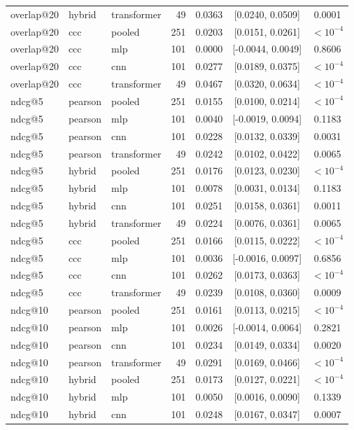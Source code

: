 \begin{longtable}{lllrrcc}
overlap@20 & hybrid & transformer & 49 & 0.0363 & [0.0240, 0.0509] & 0.0001 \\
overlap@20 & ccc & pooled & 251 & 0.0203 & [0.0151, 0.0261] & $<10^{-4}$ \\
overlap@20 & ccc & mlp & 101 & 0.0000 & [-0.0044, 0.0049] & 0.8606 \\
overlap@20 & ccc & cnn & 101 & 0.0277 & [0.0189, 0.0375] & $<10^{-4}$ \\
overlap@20 & ccc & transformer & 49 & 0.0467 & [0.0320, 0.0634] & $<10^{-4}$ \\
ndcg@5 & pearson & pooled & 251 & 0.0155 & [0.0100, 0.0214] & $<10^{-4}$ \\
ndcg@5 & pearson & mlp & 101 & 0.0040 & [-0.0019, 0.0094] & 0.1183 \\
ndcg@5 & pearson & cnn & 101 & 0.0228 & [0.0132, 0.0339] & 0.0031 \\
ndcg@5 & pearson & transformer & 49 & 0.0242 & [0.0102, 0.0422] & 0.0065 \\
ndcg@5 & hybrid & pooled & 251 & 0.0176 & [0.0123, 0.0230] & $<10^{-4}$ \\
ndcg@5 & hybrid & mlp & 101 & 0.0078 & [0.0031, 0.0134] & 0.1183 \\
ndcg@5 & hybrid & cnn & 101 & 0.0251 & [0.0158, 0.0361] & 0.0011 \\
ndcg@5 & hybrid & transformer & 49 & 0.0224 & [0.0076, 0.0361] & 0.0065 \\
ndcg@5 & ccc & pooled & 251 & 0.0166 & [0.0115, 0.0222] & $<10^{-4}$ \\
ndcg@5 & ccc & mlp & 101 & 0.0036 & [-0.0016, 0.0097] & 0.6856 \\
ndcg@5 & ccc & cnn & 101 & 0.0262 & [0.0173, 0.0363] & $<10^{-4}$ \\
ndcg@5 & ccc & transformer & 49 & 0.0239 & [0.0108, 0.0360] & 0.0009 \\
ndcg@10 & pearson & pooled & 251 & 0.0161 & [0.0113, 0.0215] & $<10^{-4}$ \\
ndcg@10 & pearson & mlp & 101 & 0.0026 & [-0.0014, 0.0064] & 0.2821 \\
ndcg@10 & pearson & cnn & 101 & 0.0234 & [0.0149, 0.0334] & 0.0020 \\
ndcg@10 & pearson & transformer & 49 & 0.0291 & [0.0169, 0.0466] & $<10^{-4}$ \\
ndcg@10 & hybrid & pooled & 251 & 0.0173 & [0.0127, 0.0221] & $<10^{-4}$ \\
ndcg@10 & hybrid & mlp & 101 & 0.0050 & [0.0016, 0.0090] & 0.1339 \\
ndcg@10 & hybrid & cnn & 101 & 0.0248 & [0.0167, 0.0347] & 0.0007 \\

\end{longtable}

